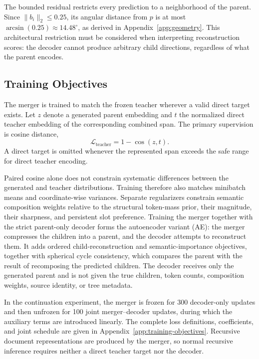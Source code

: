 \documentclass[10pt]{article}
\begin{document}
The bounded residual restricts every prediction to a neighborhood of the
parent. Since \(\lVert b_i\rVert_2\leq0.25\), its angular distance from
\(p\) is at most \(\arcsin(0.25)\approx14.48^\circ\), as derived in
Appendix~\ref{app:geometry}. This architectural restriction must be considered
when interpreting reconstruction scores: the decoder cannot produce arbitrary
child directions, regardless of what the parent encodes.

\subsection{Training Objectives}
\label{sec:training-objectives}

The merger is trained to match the frozen teacher wherever a valid direct target exists. Let \(z\) denote a generated parent embedding and \(t\) the normalized direct teacher embedding of the corresponding combined span. The primary supervision is cosine distance,
\[
\mathcal{L}_{\mathrm{teacher}}=1-\operatorname{cos}(z,t).
\]
A direct target is omitted whenever the represented span exceeds the safe range for direct teacher encoding.

Paired cosine alone does not constrain systematic differences between the
generated and teacher distributions. Training therefore also matches minibatch
means and coordinate-wise variances. Separate regularizers constrain semantic
composition weights relative to the structural token-mass prior, their magnitude,
their sharpness, and persistent slot preference. Training the merger together
with the strict parent-only decoder forms the autoencoder variant (AE): the
merger compresses the children into a parent, and the decoder attempts to
reconstruct them. It adds ordered child-reconstruction and semantic-importance
objectives, together with spherical cycle consistency, which compares the
parent with the result of recomposing the predicted children. The decoder receives only
the generated parent and is not given the true children, token counts,
composition weights, source identity, or tree metadata.

In the continuation experiment, the merger is frozen for 300 decoder-only updates and then unfrozen for 100 joint merger--decoder updates, during which the auxiliary terms are introduced linearly. The complete loss definitions, coefficients, and joint schedule are given in Appendix~\ref{app:training-objectives}. Recursive document representations are produced by the merger, so normal recursive inference requires neither a direct teacher target nor the decoder.
\end{document}
